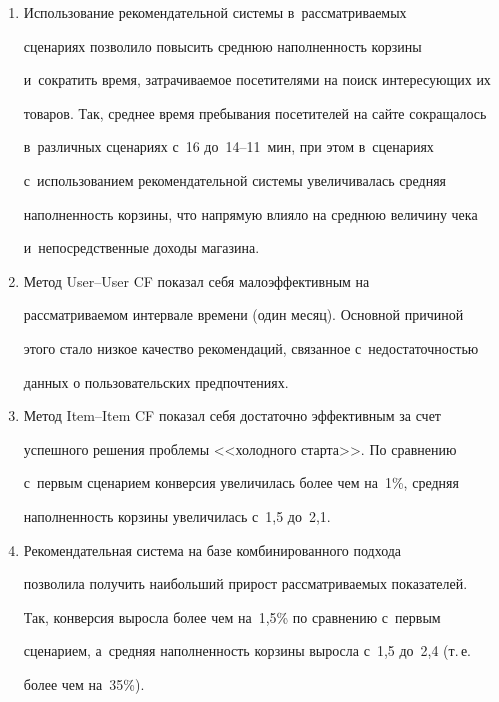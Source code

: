   \begin{enumerate}[1.]


\item Использование рекомендательной системы в~рассматриваемых 


сценариях позволило повысить среднюю наполненность корзины 


и~сократить время, затрачиваемое посетителями на поиск интересующих их 


товаров. Так, среднее время пребывания посетителей на сайте сокращалось 


в~различных сценариях с~16 до~14--11~мин, при этом в~сценариях 


с~использованием рекомендательной системы увеличивалась средняя 


наполненность корзины, что напрямую влияло на среднюю величину чека 


и~непосредственные доходы магазина. 


\item Метод User--User CF показал себя малоэффективным на 


рассматриваемом интервале времени (один месяц). Основной причиной 


этого стало низкое качество рекомендаций, связанное с~недостаточностью 


данных о пользовательских предпочтениях.


\item Метод Item--Item CF показал себя достаточно эффективным за счет 


успешного решения проблемы <<холодного старта>>. По сравнению 


с~первым сценарием конверсия увеличилась более чем на~1\%, средняя 


наполненность корзины увеличилась с~1,5 до~2,1.


\item Рекомендательная система на базе комбинированного подхода 


позволила получить наибольший прирост рассматриваемых показателей. 


Так, конверсия выросла более чем на~1,5\% по сравнению с~первым 


сценарием, а~средняя наполненность корзины выросла с~1,5 до~2,4 (т.\,е.\ 


более чем на~35\%).


  \end{enumerate}


  


